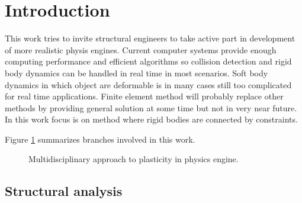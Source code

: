 \section{Introduction}

This work tries to invite structural engineers to take active part in development of more realistic physis engines.
Current computer systems provide enough computing performance and efficient algorithms so collision detection and 
rigid body dynamics can be handled in real time in most scenarios.
Soft body dynamics in which  object are deformable is in many cases still too complicated for real time applications.
Finite element method will probably replace other methods by providing general solution at some time but not in very near future.
In this work focus is on method where rigid bodies are connected by constraints.

Figure \ref{fig:areas} summarizes branches involved in this work.

\begin{figure}[htb!]
\centering
{}
\caption{Multidisciplinary approach to plasticity in physics engine.}
\label{fig:areas}
\end{figure}

\subsection{Structural analysis}

